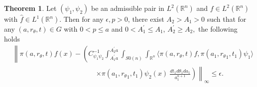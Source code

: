 \documentclass[11pt,reqno]{amsart}
\numberwithin{equation}{section}
\theoremstyle{definition}
\newtheorem{thm}{\sc Theorem}[section]
\begin{document}
\begin{thm}
Let $(\psi_1,\psi_2)$ be an admissible pair in $L^2(\mathbb{R}^n)$ and  $f\in L^2(\mathbb{R}^n)$ with $\widehat{f} \in L^1(\mathbb{R}^n)$. Then for any $\epsilon,p > 0$, there exist $A_2 > A_1 > 0 $ such that for any $(a,r_{\theta},t) \in G$ with $0< p\leq a$ and $0 < A_1^{'}\leq A_1$, $A_2^{'} \geq A_2,$  the following holds
\begin{align*}
&\left\|\pi(a,r_{\theta},t)f(x)-\left(C_{\psi_1\psi_2}^{-1}\int_{A_1^{'}a}^{A_2^{'}a}\int_{S0(n)}\int_{\mathbb{R}^n}\langle \pi(a,r_{\theta},t)f,\pi(a_1,{r_{\theta}}_1,t_1)\psi_1\rangle\right.\right.\\
&\qquad\qquad \qquad \qquad \qquad \qquad \left.\left.\times \pi(a_1,{r_{\theta}}_1,t_1)\psi_2(x)\ \frac{dt_1d\theta_1da_1}{a_1^{n+1}} \right)\right\|_{\infty}\leq \epsilon.
\end{align*}
\end{thm}
\end{document}
